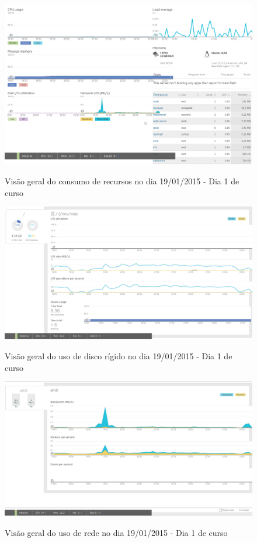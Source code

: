 \documentclass[
	12pt,				%
	oneside,			%
	a4paper,			%
	english,			%
	brazil				%
	]{abntex2ppgsi}
\begin{document}
\begin{apendicesenv}
\begin{figure}[h]
\centering
\caption{Visão geral do consumo de recursos no dia 19/01/2015 - Dia 1 de curso}
\includegraphics[width=1.0\textwidth]{relatorios/19-01-15/dashboard_cropped.pdf} 
\label{fig:recursos_dia1_1} 
\end{figure}

\begin{figure}[h]
\centering
\caption{Visão geral do uso de disco rígido no dia 19/01/2015 - Dia 1 de curso}
\includegraphics[width=1.0\textwidth]{relatorios/19-01-15/disk_cropped.pdf} 
\label{fig:recursos_dia1_2} 
\end{figure}


\begin{figure}[p]
\centering
\caption{Visão geral do uso de rede no dia 19/01/2015 - Dia 1 de curso}
\includegraphics[width=1.0\textwidth]{relatorios/19-01-15/network_cropped.pdf} 
\label{fig:recursos_dia1_3} 
\end{figure}


\end{apendicesenv}
\end{document}
